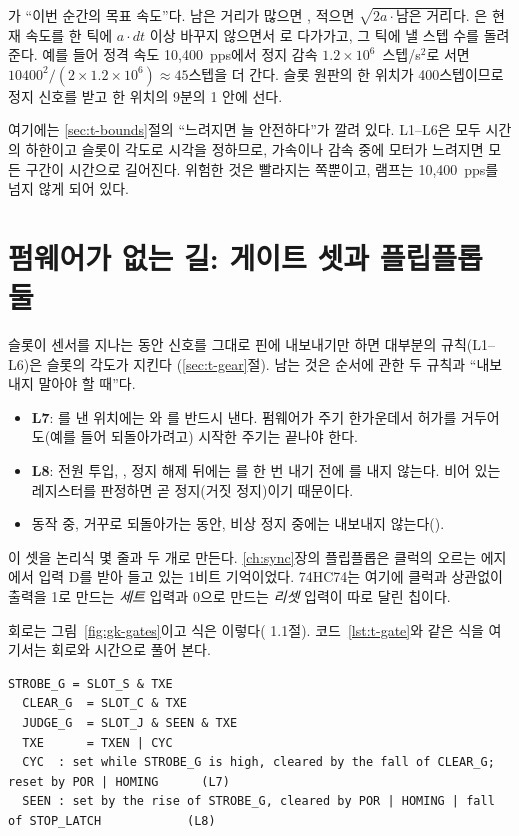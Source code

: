 가 ``이번 순간의 목표 속도''다. 남은 거리가 많으면 , 적으면 $\sqrt{2a \cdot \text{남은 거리}}$다.
은 현재 속도를 한 틱에 $a \cdot dt$ 이상 바꾸지 않으면서 로 다가가고, 그 틱에 낼 스텝 수를 돌려준다.
예를 들어 정격 속도 10,400~pps에서 정지 감속 $1.2 \times 10^6$~스텝/s$^2$로 서면 $10400^2 / (2 \times 1.2 \times 10^6) \approx
45$스텝을 더 간다. 슬롯 원판의 한 위치가 400스텝이므로 정지 신호를 받고 한 위치의 9분의 1 안에 선다.

여기에는 \ref{sec:t-bounds}절의 ``느려지면 늘 안전하다''가 깔려 있다. L1--L6은 모두 시간의 하한이고 슬롯이 각도로
시각을 정하므로, 가속이나 감속 중에 모터가 느려지면 모든 구간이 시간으로 길어진다. 위험한 것은 빨라지는 쪽뿐이고,
램프는 10,400~pps를 넘지 않게 되어 있다.

\section{펌웨어가 없는 길: 게이트 셋과 플립플롭 둘}\label{sec:gk-gates}

\Why 슬롯이 센서를 지나는 동안 신호를 그대로 핀에 내보내기만 하면 대부분의 규칙(L1--L6)은 슬롯의 각도가 지킨다
(\ref{sec:t-gear}절). 남는 것은 순서에 관한 두 규칙과 ``내보내지 말아야 할 때''다.

\begin{itemize}
\item \textbf{L7}: 를 낸 위치에는 와 를 반드시 낸다. 펌웨어가 주기 한가운데서 허가를
거두어도(예를 들어 되돌아가려고) 시작한 주기는 끝나야 한다.
\item \textbf{L8}: 전원 투입, , 정지 해제 뒤에는 를 한 번 내기 전에 를 내지 않는다. 비어 있는
레지스터를 판정하면 곧 정지(거짓 정지)이기 때문이다.
\item {} 동작 중, 거꾸로 되돌아가는 동안, 비상 정지 중에는 내보내지 않는다().
\end{itemize}

이 셋을 논리식 몇 줄과  두 개로 만든다. \ref{ch:sync}장의 플립플롭은 클럭의 오르는 에지에서
입력 D를 받아 들고 있는 1비트 기억이었다. 74HC74는 여기에 클럭과 상관없이 출력을 1로 만드는 \emph{세트} 입력과 0으로
만드는 \emph{리셋} 입력이 따로 달린 칩이다.

\Ours 회로는 그림~\ref{fig:gk-gates}이고 식은 이렇다( 1.1절). 코드~\ref{lst:t-gate}와 같은 식을
여기서는 회로와 시간으로 풀어 본다.
\begin{lstlisting}[numbers=none,caption={타이밍 경로의 논리.},label={lst:gk-eq}]
  STROBE_G = SLOT_S & TXE
  CLEAR_G  = SLOT_C & TXE
  JUDGE_G  = SLOT_J & SEEN & TXE
  TXE      = TXEN | CYC
  CYC  : set while STROBE_G is high, cleared by the fall of CLEAR_G; reset by POR | HOMING      (L7)
  SEEN : set by the rise of STROBE_G, cleared by POR | HOMING | fall of STOP_LATCH            (L8)
\end{lstlisting}

